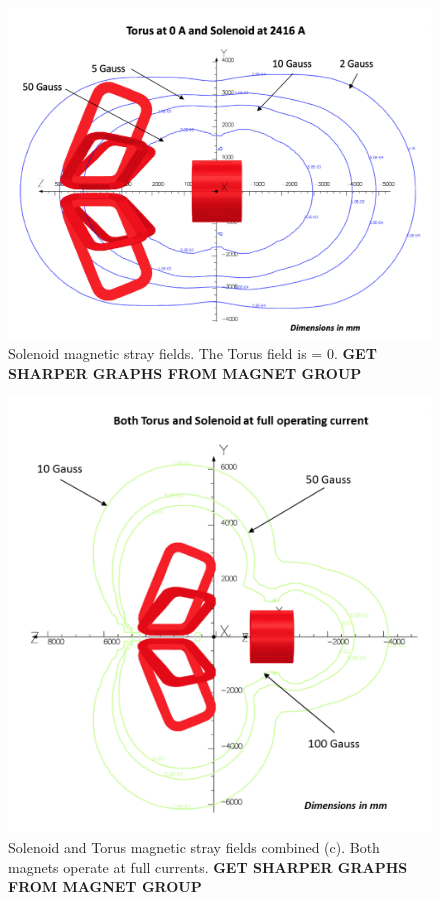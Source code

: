 \documentclass[final,3p,twocolumn]{elsarticle}
\begin{document}
\begin{figure}[htbp!]
\centerline{\includegraphics[width=1.0\columnwidth]{mag-field-1.png}}
\caption{Solenoid magnetic stray fields. The Torus field is = 0. {\bf GET SHARPER GRAPHS FROM MAGNET GROUP}}
\label{stray-field}
\end{figure}

\begin{figure}[htbp!]
\centerline{\includegraphics[width=1.2\columnwidth]{mag-field-2.png}}
\caption{Solenoid and Torus magnetic stray fields combined (c). Both magnets operate at full currents.  {\bf GET
SHARPER GRAPHS FROM MAGNET GROUP}  }
\label{stray-field}
\end{figure}
\end{document}
